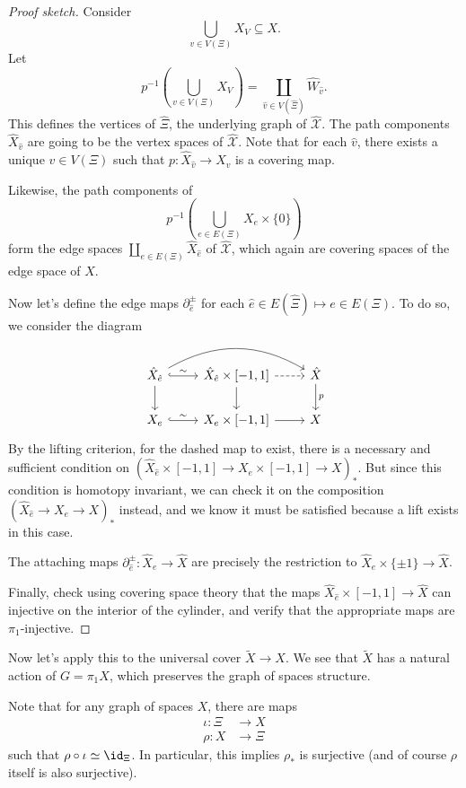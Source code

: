 \documentclass[a4paper]{article}
\begin{document}
\begin{proof}[Proof sketch]
  Consider
  \[
    \bigcup_{v \in V(\Xi)} X_V \subseteq X.
  \]
  Let
  \[
    p^{-1}\left(\bigcup_{v \in V(\Xi)} X_V\right) = \coprod_{\hat{v} \in V(\hat{\Xi})} \hat{W}_{\hat{v}}.
  \]
  This defines the vertices of $\hat{\Xi}$, the underlying graph of $\hat{\mathcal{X}}$. The path components $\hat{X}_{\hat{v}}$ are going to be the vertex spaces of $\hat{\mathcal{X}}$. Note that for each $\hat{v}$, there exists a unique $v \in V(\Xi)$ such that $p: \hat{X}_{\hat{v}} \to X_v$ is a covering map.

  Likewise, the path components of
  \[
    p^{-1}\left(\bigcup_{e \in E(\Xi)} X_e \times \{0\}\right)
  \]
  form the edge spaces $\coprod_{e \in E(\Xi)} \hat{X}_{\hat{e}}$ of $\hat{\mathcal{X}}$, which again are covering spaces of the edge space of $X$.

  Now let's define the edge maps $\partial_{\hat{e}}^{\pm}$ for each $\hat{e} \in E(\hat{\Xi}) \mapsto e \in E(\Xi)$. To do so, we consider the diagram
  \[
    \begin{tikzcd}
      \hat{X}_{\hat{e}} \ar[r, hook, "\sim"] \ar[rr, bend left] \ar[d] & \hat{X}_{\hat{e}} \times [-1, 1] \ar[d] \ar[r, dashed] & \hat{X} \ar[d, "p"]\\
      X_e \ar[r, hook, "\sim"] & X_e \times [-1, 1] \ar[r] & X
    \end{tikzcd}
  \]
  By the lifting criterion, for the dashed map to exist, there is a necessary and sufficient condition on $(\hat{X}_{\hat{e}} \times [-1, 1] \to X_e \times [-1, 1] \to X)_*$. But since this condition is homotopy invariant, we can check it on the composition $(\hat{X}_{\hat{e}} \to X_e \to X)_*$ instead, and we know it must be satisfied because a lift exists in this case.

  The attaching maps $\partial^{\pm}_{\hat{e}}: \hat{X}_e \to \hat{X}$ are precisely the restriction to $\hat{X}_e \times \{\pm 1\} \to \hat{X}$.

  Finally, check using covering space theory that the maps $\hat{X}_{\hat{e}} \times [-1, 1] \to \hat{X}$ can injective on the interior of the cylinder, and verify that the appropriate maps are $\pi_1$-injective.
\end{proof}

Now let's apply this to the universal cover $\tilde{X} \to X$. We see that $\tilde{X}$ has a natural action of $G = \pi_1X$, which preserves the graph of spaces structure.

Note that for any graph of spaces $X$, there are maps
\begin{align*}
  \iota: \Xi &\to X\\
  \rho: X &\to \Xi
\end{align*}
such that $\rho \circ \iota \simeq \id_{\Xi}$. In particular, this implies $\rho_*$ is surjective (and of course $\rho$ itself is also surjective).
\end{document}
